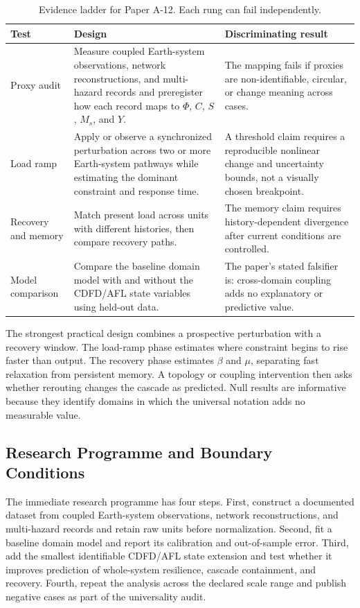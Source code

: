 \documentclass[12pt,a4paper]{article}
\begin{document}
\begin{table}[htbp]
\centering
\small
\caption{Evidence ladder for Paper A-12. Each rung can fail independently.}
\begin{tabularx}{\textwidth}{|p{}|X|X|}
\hline
\textbf{Test} & \textbf{Design} & \textbf{Discriminating result} \\
\hline
Proxy audit & Measure coupled Earth-system observations, network reconstructions, and multi-hazard records and preregister how each record maps to $\Phi$, $C$, $S$, $M_s$, and $Y$. & The mapping fails if proxies are non-identifiable, circular, or change meaning across cases. \\
\hline
Load ramp & Apply or observe a synchronized perturbation across two or more Earth-system pathways while estimating the dominant constraint and response time. & A threshold claim requires a reproducible nonlinear change and uncertainty bounds, not a visually chosen breakpoint. \\
\hline
Recovery and memory & Match present load across units with different histories, then compare recovery paths. & The memory claim requires history-dependent divergence after current conditions are controlled. \\
\hline
Model comparison & Compare the baseline domain model with and without the CDFD/AFL state variables using held-out data. & The paper's stated falsifier is: cross-domain coupling adds no explanatory or predictive value. \\
\hline
\end{tabularx}
\end{table}

The strongest practical design combines a prospective perturbation with a
recovery window. The load-ramp phase estimates where constraint begins to rise
faster than output. The recovery phase estimates $\beta$ and $\mu$, separating
fast relaxation from persistent memory. A topology or coupling intervention
then asks whether rerouting changes the cascade as predicted. Null results are
informative because they identify domains in which the universal notation adds
no measurable value.

\subsection{Research Programme and Boundary Conditions}

The immediate research programme has four steps. First, construct a documented
dataset from coupled Earth-system observations, network reconstructions, and multi-hazard records and retain raw units before normalization.
Second, fit a baseline domain model and report its calibration and out-of-sample
error. Third, add the smallest identifiable CDFD/AFL state extension and test
whether it improves prediction of whole-system resilience, cascade containment, and recovery. Fourth, repeat the
analysis across the declared scale range and publish negative cases as part of
the universality audit.
\end{document}
